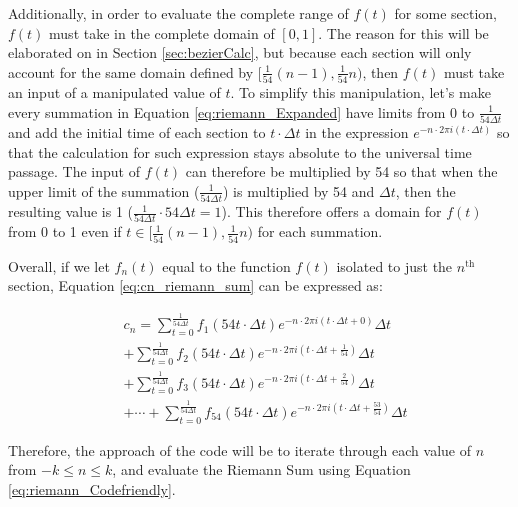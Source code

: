 \documentclass[letterpaper, 12pt]{article}
\begin{document}
Additionally, in order to evaluate the complete range of \(f(t)\)
for some section, \(f(t)\) must take in the complete domain of
\([0, 1]\). The reason for this will be elaborated on in
Section \ref*{sec:bezierCalc}, but because each section will only
account for the same domain defined by \([\frac{1}{54}(n-1), \frac{1}{54}n)\),
then \(f(t)\) must take an input of a manipulated value of \(t\).
To simplify this manipulation, let's make every summation in
Equation \ref*{eq:riemann_Expanded} have limits from 0 to
\(\frac{1}{54\Delta t}\) and add the initial time of each
section to \(t \cdot \Delta t\) in the expression
\(e^{-n \cdot 2\pi i(t \cdot \Delta t)}\) so that
the calculation for such expression stays absolute to the universal
time passage. The input of \(f(t)\) can therefore be multiplied
by 54 so that when the upper limit of the summation (\(\frac{1}{54\Delta t}\))
is multiplied by 54 and \(\Delta t\), then the resulting value
is 1 (\(\frac{1}{54\Delta t} \cdot 54\Delta t = 1\)).
This therefore offers a domain for \(f(t)\) from 0 to 1 even if
\(t \in [\frac{1}{54}(n-1), \frac{1}{54}n)\) for each
summation.


Overall, if we let \(f_n(t)\) equal to the function \(f(t)\) isolated
to just the \(n^{\text{th}}\) section,
Equation \ref*{eq:cn_riemann_sum} can
be expressed as:

\begin{equation}
    \begin{aligned} \label{eq:riemann_Codefriendly}
         & c_n = \sum_{t = 0}^{\frac{1}{54\Delta t}} f_1(54t \cdot \Delta t) e^{-n \cdot 2\pi i(t \cdot \Delta t + 0)} \Delta t
        \\
         & + \sum_{t = 0}^{\frac{1}{54\Delta t}} f_2(54t \cdot \Delta t) e^{-n \cdot 2\pi i(t \cdot \Delta t + \frac{1}{54})} \Delta t
        \\
         & + \sum_{t = 0}^{\frac{1}{54\Delta t}} f_3(54t \cdot \Delta t) e^{-n \cdot 2\pi i(t \cdot \Delta t + \frac{2}{54})} \Delta t
        \\
         & + \cdots +
        \sum_{t = 0}^{\frac{1}{54\Delta t}} f_{54}(54t \cdot \Delta t) e^{-n \cdot 2\pi i(t \cdot \Delta t + \frac{53}{54})} \Delta t
    \end{aligned}
\end{equation}

Therefore, the approach of the code will be to iterate through
each value of \(n\) from \(-k \le n \le k\), and evaluate
the Riemann Sum using Equation \ref*{eq:riemann_Codefriendly}.
\end{document}
